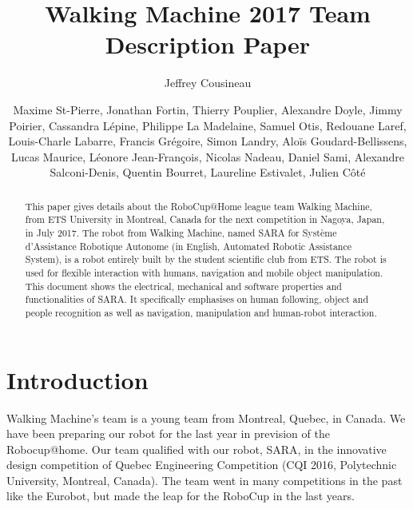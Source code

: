 \documentclass[runningheads,a4paper]{llncs}
\begin{document}
\title{Walking Machine 2017 Team Description Paper}

\author{Jeffrey Cousineau \and Maxime St-Pierre, Jonathan Fortin, Thierry Pouplier, Alexandre Doyle, Jimmy Poirier, Cassandra Lépine, Philippe La Madelaine, Samuel Otis, Redouane Laref, Louis-Charle Labarre, Francis Grégoire, Simon Landry, Aloïs Goudard-Bellissens, Lucas Maurice, Léonore Jean-François, Nicolas Nadeau, Daniel Sami, Alexandre Salconi-Denis, Quentin Bourret, Laureline Estivalet, Julien Côté }
\maketitle



\begin{abstract}

This paper gives details about the RoboCup@Home league team Walking Machine, from ETS University in Montreal, Canada for the next competition in Nagoya, Japan, in July 2017. The robot from Walking Machine, named SARA for Système d’Assistance Robotique Autonome (in English, Automated Robotic Assistance System), is a robot entirely built by the student scientific club from ETS. The robot is used for flexible interaction with humans, navigation and mobile
object manipulation. This document shows the electrical, mechanical and software properties and functionalities of SARA. It specifically emphasises on human following, object and people recognition as well as navigation, manipulation and human-robot interaction.

\end{abstract}



\section{Introduction}
Walking Machine’s team is a young team from Montreal, Quebec, in Canada. We have been preparing our robot for the last year in prevision of the Robocup@home. Our team qualified with our robot, SARA, in the innovative design competition of Quebec Engineering Competition (CQI 2016, Polytechnic University, Montreal, Canada). The team went in many competitions in the past like the Eurobot, but made the leap for the RoboCup in the last years. \\
\end{document}
